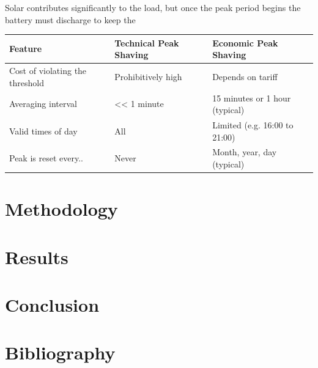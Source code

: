 \documentclass[
]{article}
\begin{document}
Solar contributes significantly to the load, but once the peak period
begins the battery must discharge to keep the

\begin{longtable}[]{@{}lll@{}}
\toprule
Feature & Technical Peak Shaving & Economic Peak Shaving\tabularnewline
\midrule
\endhead
Cost of violating the threshold & Prohibitively high & Depends on
tariff\tabularnewline
Averaging interval & \textless\textless{} 1 minute & 15 minutes or 1
hour (typical)\tabularnewline
Valid times of day & All & Limited (e.g. 16:00 to 21:00)\tabularnewline
Peak is reset every.. & Never & Month, year, day
(typical)\tabularnewline
\bottomrule
\end{longtable}

\hypertarget{methodology}{%
\section{Methodology}\label{methodology}}

\hypertarget{results}{%
\section{Results}\label{results}}

\hypertarget{conclusion}{%
\section{Conclusion}\label{conclusion}}

\hypertarget{bibliography}{%
\section{Bibliography}\label{bibliography}}
\end{document}
